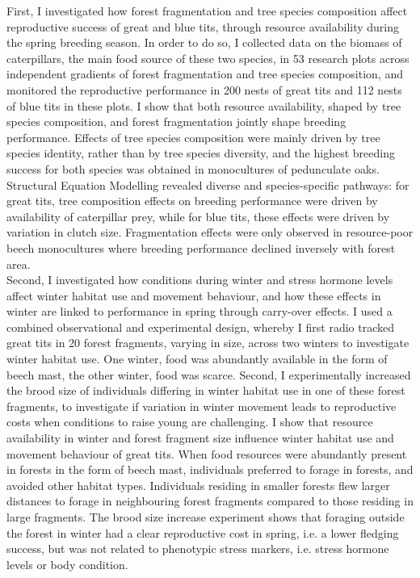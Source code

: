 \documentclass[10pt, twoside]{book} %
\begin{document}
First, I investigated how forest fragmentation and tree species composition affect reproductive success of great and blue tits, through resource availability during the spring breeding season. In order to do so, I collected data on the biomass of caterpillars, the main food source of these two species, in 53 research plots across independent gradients of forest fragmentation and tree species composition, and monitored the reproductive performance in 200 nests of great tits and 112 nests of blue tits in these plots. I show that both resource availability, shaped by tree species composition, and forest fragmentation jointly shape breeding performance. Effects of tree species composition were mainly driven by tree species identity, rather than by tree species diversity, and the highest breeding success for both species was obtained in monocultures of pedunculate oaks. Structural Equation Modelling revealed diverse and species-specific pathways: for great tits, tree composition effects on breeding performance were driven by availability of caterpillar prey, while for blue tits, these effects were driven by variation in clutch size. Fragmentation effects were only observed in resource-poor beech monocultures where breeding performance declined inversely with forest area.\\

Second, I investigated how conditions during winter and stress hormone levels affect winter habitat use and movement behaviour, and how these effects in winter are linked to performance in spring through carry-over effects. I used a combined observational and experimental design, whereby I first radio tracked great tits in 20 forest fragments, varying in size, across two winters to investigate winter habitat use. One winter, food was abundantly available in the form of beech mast, the other winter, food was scarce. Second, I experimentally increased the brood size of individuals differing in winter habitat use in one of these forest fragments, to investigate if variation in winter movement leads to reproductive costs when conditions to raise young are challenging. I show that resource availability in winter and forest fragment size influence winter habitat use and movement behaviour of great tits. When food resources were abundantly present in forests in the form of beech mast, individuals preferred to forage in forests, and avoided other habitat types. Individuals residing in smaller forests flew larger distances to forage in neighbouring forest fragments compared to those residing in large fragments. The brood size increase experiment shows that foraging outside the forest in winter had a clear reproductive cost in spring, i.e. a lower fledging success, but was not related to phenotypic stress markers, i.e. stress hormone levels or body condition.\\
\end{document}
